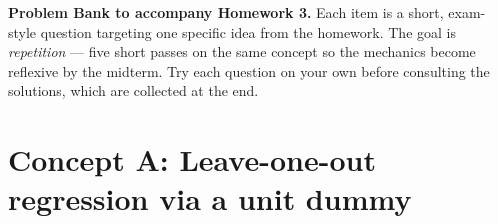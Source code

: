 \documentclass{article}
\begin{document}
\noindent\textbf{Problem Bank to accompany Homework 3.}  Each item is a short, exam-style question targeting one specific idea from the homework.  The goal is \emph{repetition} --- five short passes on the same concept so the mechanics become reflexive by the midterm.  Try each question on your own before consulting the solutions, which are collected at the end.

\bigskip

\section*{Concept A: Leave-one-out regression via a unit dummy}
\end{document}
